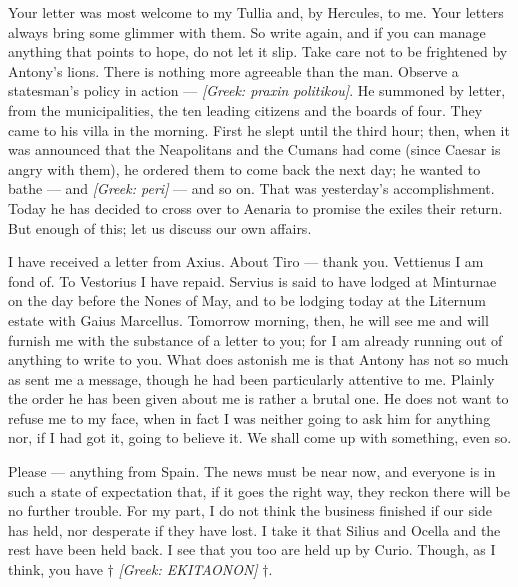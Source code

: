 

 Your letter was most welcome to my Tullia and, by Hercules, to me. Your letters always bring some glimmer with them. So write again, and if you can manage anything that points to hope, do not let it slip. Take care not to be frightened by Antony's lions. There is nothing more agreeable than the man. Observe a statesman's policy in action --- \textit{[Greek: praxin politikou]}. He summoned by letter, from the municipalities, the ten leading citizens and the boards of four. They came to his villa in the morning. First he slept until the third hour; then, when it was announced that the Neapolitans and the Cumans had come (since Caesar is angry with them), he ordered them to come back the next day; he wanted to bathe --- and \textit{[Greek: peri]} --- and so on. That was yesterday's accomplishment. Today he has decided to cross over to Aenaria to promise the exiles their return. But enough of this; let us discuss our own affairs.

 I have received a letter from Axius. About Tiro --- thank you. Vettienus I am fond of. To Vestorius I have repaid. Servius is said to have lodged at Minturnae on the day before the Nones of May, and to be lodging today at the Liternum estate with Gaius Marcellus. Tomorrow morning, then, he will see me and will furnish me with the substance of a letter to you; for I am already running out of anything to write to you. What does astonish me is that Antony has not so much as sent me a message, though he had been particularly attentive to me. Plainly the order he has been given about me is rather a brutal one. He does not want to refuse me to my face, when in fact I was neither going to ask him for anything nor, if I had got it, going to believe it. We shall come up with something, even so.

 Please --- anything from Spain. The news must be near now, and everyone is in such a state of expectation that, if it goes the right way, they reckon there will be no further trouble. For my part, I do not think the business finished if our side has held, nor desperate if they have lost. I take it that Silius and Ocella and the rest have been held back. I see that you too are held up by Curio. Though, as I think, you have $\dagger$ \textit{[Greek: EKITAONON]} $\dagger$.
